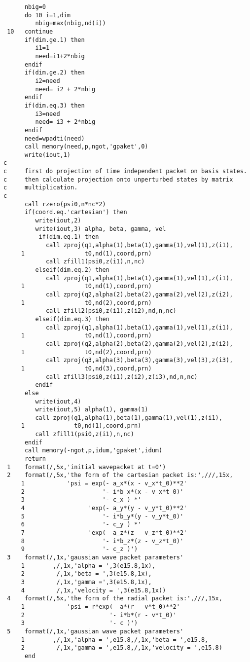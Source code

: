 \documentclass{article}
\begin{document}
\begin{verbatim}
      nbig=0
      do 10 i=1,dim
         nbig=max(nbig,nd(i))
 10   continue   
      if(dim.ge.1) then
         i1=1
         need=i1+2*nbig
      endif
      if(dim.ge.2) then
         i2=need
         need= i2 + 2*nbig
      endif
      if(dim.eq.3) then
         i3=need
         need= i3 + 2*nbig
      endif  
      need=wpadti(need)
      call memory(need,p,ngot,'gpaket',0)
      write(iout,1)
c     
c     first do projection of time independent packet on basis states.
c     then calculate projection onto unperturbed states by matrix
c     multiplication.
c
      call rzero(psi0,n*nc*2)
      if(coord.eq.'cartesian') then
         write(iout,2)
         write(iout,3) alpha, beta, gamma, vel
          if(dim.eq.1) then
            call zproj(q1,alpha(1),beta(1),gamma(1),vel(1),z(i1),
     1                 t0,nd(1),coord,prn)
            call zfill1(psi0,z(i1),n,nc)
         elseif(dim.eq.2) then
            call zproj(q1,alpha(1),beta(1),gamma(1),vel(1),z(i1),
     1                 t0,nd(1),coord,prn)
            call zproj(q2,alpha(2),beta(2),gamma(2),vel(2),z(i2),
     1                 t0,nd(2),coord,prn)
            call zfill2(psi0,z(i1),z(i2),nd,n,nc)
         elseif(dim.eq.3) then
            call zproj(q1,alpha(1),beta(1),gamma(1),vel(1),z(i1),
     1                 t0,nd(1),coord,prn)
            call zproj(q2,alpha(2),beta(2),gamma(2),vel(2),z(i2),
     1                 t0,nd(2),coord,prn)
            call zproj(q3,alpha(3),beta(3),gamma(3),vel(3),z(i3),
     1                 t0,nd(3),coord,prn)
            call zfill3(psi0,z(i1),z(i2),z(i3),nd,n,nc)
         endif
      else
         write(iout,4)
         write(iout,5) alpha(1), gamma(1)
         call zproj(q1,alpha(1),beta(1),gamma(1),vel(1),z(i1),
     1              t0,nd(1),coord,prn)
         call zfill1(psi0,z(i1),n,nc)
      endif
      call memory(-ngot,p,idum,'gpaket',idum) 
      return
 1    format(/,5x,'initial wavepacket at t=0')
 2    format(/,5x,'the form of the cartesian packet is:',///,15x,
     1            'psi = exp(- a_x*(x - v_x*t_0)**2'
     2                      '- i*b_x*(x - v_x*t_0)'
     3                      '- c_x ) *'    
     4                  'exp(- a_y*(y - v_y*t_0)**2'
     5                      '- i*b_y*(y - v_y*t_0)'
     6                      '- c_y ) *'    
     7                  'exp(- a_z*(z - v_z*t_0)**2'
     8                      '- i*b_z*(z - v_z*t_0)'
     9                      '- c_z )')    
 3    format(/,1x,'gaussian wave packet parameters'
     1        ,/,1x,'alpha = ',3(e15.8,1x),
     2         /,1x,'beta = ',3(e15.8,1x),
     3         /,1x,'gamma =',3(e15.8,1x),
     4         /,1x,'velocity = ',3(e15.8,1x))
 4    format(/,5x,'the form of the radial packet is:',///,15x,
     1            'psi = r*exp(- a*(r - v*t_0)**2'
     2                        '- i*b*(r - v*t_0)'
     3                        '- c )')
 5    format(/,1x,'gaussian wave packet parameters'
     1        ,/,1x,'alpha = ',e15.8,/,1x,'beta = ',e15.8,
     2         /,1x,'gamma = ',e15.8,/,1x,'velocity = ',e15.8)
      end       
\end{verbatim}
\end{document}
